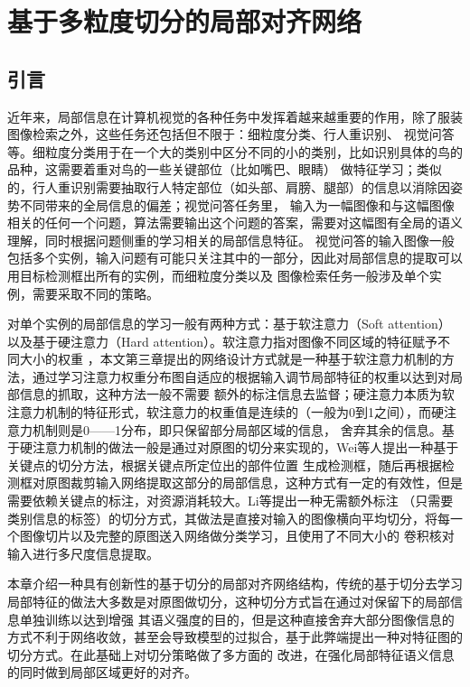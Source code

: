 \chapter{基于多粒度切分的局部对齐网络}

\section{引言}
近年来，局部信息在计算机视觉的各种任务中发挥着越来越重要的作用，除了服装图像检索之外，这些任务还包括但不限于：细粒度分类、行人重识别、
视觉问答等。细粒度分类用于在一个大的类别中区分不同的小的类别，比如识别具体的鸟的品种，这需要着重对鸟的一些关键部位（比如嘴巴、眼睛）
做特征学习\cite{wang2018learning}；类似的，行人重识别需要抽取行人特定部位（如头部、肩膀、腿部）的信息以消除因姿势不同带来的全局信息的偏差\cite{sun2018beyond}；视觉问答任务里，
输入为一幅图像和与这幅图像相关的任何一个问题，算法需要输出这个问题的答案，需要对这幅图有全局的语义理解，同时根据问题侧重的学习相关的局部信息特征。
视觉问答的输入图像一般包括多个实例，输入问题有可能只关注其中的一部分，因此对局部信息的提取可以用目标检测框出所有的实例\cite{anderson2018bottom}，而细粒度分类以及
图像检索任务一般涉及单个实例，需要采取不同的策略。

对单个实例的局部信息的学习一般有两种方式：基于软注意力（Soft attention）以及基于硬注意力（Hard attention）。软注意力指对图像不同区域的特征赋予不同大小的权重
，本文第三章提出的网络设计方式就是一种基于软注意力机制的方法，通过学习注意力权重分布图自适应的根据输入调节局部特征的权重以达到对局部信息的抓取，这种方法一般不需要
额外的标注信息去监督；硬注意力本质为软注意力机制的特征形式，软注意力的权重值是连续的（一般为0到1之间），而硬注意力机制则是0——1分布，即只保留部分局部区域的信息，
舍弃其余的信息。基于硬注意力机制的做法一般是通过对原图的切分来实现的，Wei等人提出一种基于关键点的切分方法\cite{wei2017glad}，根据关键点所定位出的部件位置
生成检测框，随后再根据检测框对原图裁剪输入网络提取这部分的局部信息，这种方式有一定的有效性，但是需要依赖关键点的标注，对资源消耗较大。Li等提出一种无需额外标注
（只需要类别信息的标签）的切分方式\cite{li2017learning}，其做法是直接对输入的图像横向平均切分，将每一个图像切片以及完整的原图送入网络做分类学习，且使用了不同大小的
卷积核对输入进行多尺度信息提取。

本章介绍一种具有创新性的基于切分的局部对齐网络结构，传统的基于切分去学习局部特征的做法大多数是对原图做切分，这种切分方式旨在通过对保留下的局部信息单独训练以达到增强
其语义强度的目的，但是这种直接舍弃大部分图像信息的方式不利于网络收敛，甚至会导致模型的过拟合，基于此弊端提出一种对特征图的切分方式。在此基础上对切分策略做了多方面的
改进，在强化局部特征语义信息的同时做到局部区域更好的对齐。
